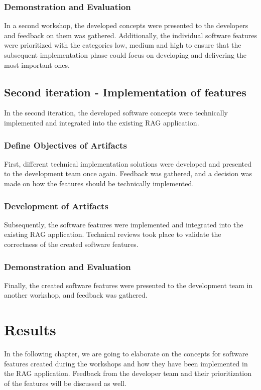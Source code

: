\documentclass[
	english,
	ruledheaders=section,%
	class=report,%
	thesis={type=bachelor},%
	accentcolor=1b,%
	custommargins=true,%
	marginpar=false,%
	parskip=half-,%
	fontsize=11pt,%
	DIV=14,
]{tudapub}
\begin{document}
\subsection{Demonstration and Evaluation}
In a second workshop, the developed concepts were presented to the developers and feedback on them was gathered. Additionally, the individual software features were prioritized with the categories low, medium and high to ensure that the subsequent implementation phase could focus on developing and delivering the most important ones.
\section{Second iteration - Implementation of features}
In the second iteration, the developed software concepts were technically implemented and integrated into the existing RAG application.
\subsection{Define Objectives of Artifacts}
First, different technical implementation solutions were developed and presented to the development team once again. Feedback was gathered, and a decision was made on how the features should be technically implemented.
\subsection{Development of Artifacts}
Subsequently, the software features were implemented and integrated into the existing RAG application. Technical reviews took place to validate the correctness of the created software features.
\subsection{Demonstration and Evaluation}
Finally, the created software features were presented to the development team in another workshop, and feedback was gathered.
\chapter{Results}
In the following chapter, we are going to elaborate on the concepts for software features created during the workshops and how they have been implemented in the RAG application. Feedback from the developer team and their prioritization of the features will be discussed as well.
\end{document}
